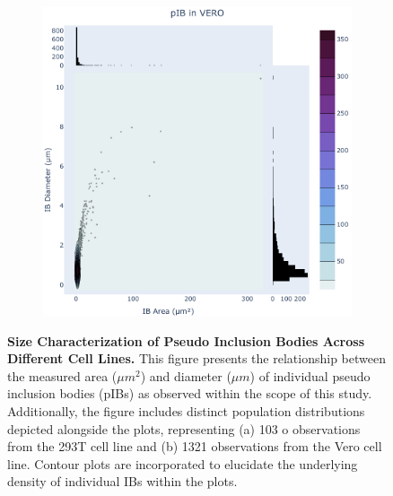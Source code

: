 \begin{figure}
\begin{subfigure}{0.495\textwidth}
        \includegraphics[width=\textwidth]{08. Chapter 3/Figs/03. pIB/01. pIB characterisation/02. heatmap_pib-vero.pdf}
    \end{subfigure}
    \caption[Size Characterization of Pseudo Inclusion Bodies Across Different Cell Lines.]{\textbf{Size Characterization of Pseudo Inclusion Bodies Across Different Cell Lines.} This figure presents the relationship between the measured area (\(\mu m^2\)) and diameter (\(\mu m\)) of individual pseudo inclusion bodies (pIBs) as observed within the scope of this study. Additionally, the figure includes distinct population distributions depicted alongside the plots, representing (a) 103
     o observations from the 293T cell line and (b) 1321 observations from the Vero cell line. Contour plots are incorporated to elucidate the underlying density of individual IBs within the plots.}
    \label{fig:Size Characterization of Pseudo Inclusion Bodies Across Different Cell Lines}
\end{figure}


